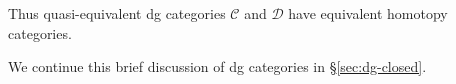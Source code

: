 Thus quasi-equivalent dg categories $\mathcal{C}$ and $\mathcal{D}$ have
equivalent homotopy categories.

We continue this brief discussion of dg categories in \S\ref{sec:dg-closed}.
